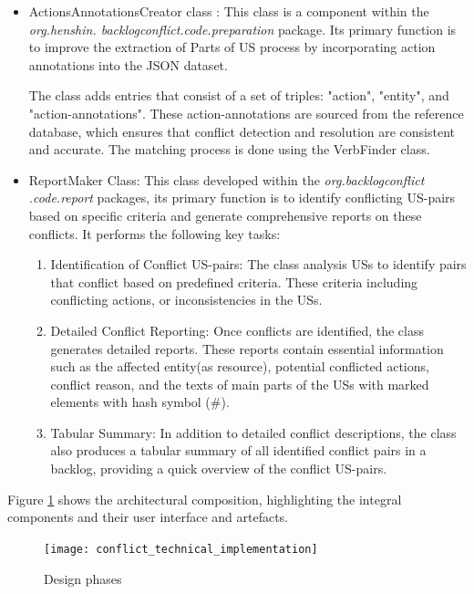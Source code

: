 \begin{itemize}
	\item ActionsAnnotationsCreator class : This class is a component within the \textit{org.henshin. backlogconflict.code.preparation} package. Its primary function is to improve the extraction of Parts of US process by incorporating action annotations into the JSON dataset. 
	
	The class adds entries that consist of a set of triples: "action", "entity", and "action-annotations". These action-annotations are sourced from the reference database, which ensures that conflict detection and resolution are consistent and accurate. The matching process is done using the VerbFinder class. 
	
	\item ReportMaker Class: This class developed within the \textit{org.backlogconflict .code.report} packages, its primary function is to identify conflicting US-pairs based on specific criteria and generate comprehensive reports on these conflicts. It performs the following key tasks:%
	\begin{enumerate}
		\item Identification of Conflict US-pairs: The class analysis USs to identify pairs that conflict based on predefined criteria. These criteria including conflicting actions, or inconsistencies in the USs.
		
		\item Detailed Conflict Reporting: Once conflicts are identified, the class generates detailed reports. These reports contain essential information such as the affected entity(as resource), potential conflicted actions, conflict reason, and the texts of main parts of the USs with marked elements with hash symbol (\#).
		
		\item Tabular Summary: In addition to detailed conflict descriptions, the class also produces a tabular summary of all identified conflict pairs in a backlog, providing a quick overview of the conflict US-pairs.
	\end{enumerate}

	
\end{itemize}
Figure \ref{fig:conflict_technical_implementation} shows the architectural composition, highlighting the integral components and their user interface and artefacts.
\begin{figure}[h]
	\centering 
	\texttt{[image: conflict\_technical\_implementation]}
	\caption{Design phases}\label{fig:conflict_technical_implementation}
\end{figure}
